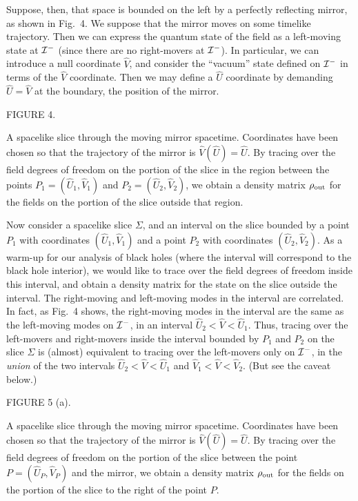 Suppose, then, that space is bounded on the left by a perfectly reflecting
mirror, as shown in Fig.~4.  We suppose that the mirror moves on some timelike
trajectory.  Then we can express the quantum state of the field as a
left-moving state at ${\cal I}^-$ (since there are no right-movers at ${\cal
I}^-$).  In particular, we can introduce a null coordinate $\hat V$, and
consider the ``vacuum'' state defined on ${\cal I}^-$ in terms of the $\hat V$
coordinate.  Then we may define a $\hat U$ coordinate by demanding $\hat U=\hat
V$ at the boundary, the position of the mirror.

\midinsert
\epsfysize=3in
\centerline{ }
\bigskip
\centerline{FIGURE 4.}
\medskip
{\centerline{\vbox{\hsize 5in \singlespace\tenrm \noindent
A spacelike slice through the moving mirror spacetime.
Coordinates have been chosen so that the trajectory of the mirror is $\hat
V(\hat U)=\hat U$. By tracing over the field degrees of freedom on the portion
of the slice in the region between the points $P_1=(\hat U_1, \hat V_1)$ and
$P_2=(\hat U_2,\hat V_2)$, we obtain a density matrix $\rho_{\rm out}$ for the
fields on the portion of the slice outside that region.
 }}}


\endinsert

Now consider a spacelike slice $\Sigma$, and an interval on the slice bounded
by a point $P_1$ with coordinates
$({\hat U}_1,{\hat V}_1)$ and a point $P_2$
with coordinates $({\hat U}_2,{\hat V}_2)$.  As a warm-up for our analysis of
black holes (where the interval will correspond to the black hole interior), we
would like to trace over the
field degrees of freedom inside this interval, and obtain a density matrix for
the state on the slice outside the interval.  The right-moving and left-moving
modes in the interval are correlated.  In fact, as Fig.~4 shows, the
right-moving modes in the interval are the same as the left-moving modes on
${\cal I}^-$, in an interval ${\hat U}_2<\hat V< {\hat U}_1$.  Thus, tracing
over the left-movers and right-movers inside the interval bounded by $P_1$ and
$P_2$
on the slice $\Sigma$ is (almost) equivalent to tracing over the left-movers
only on ${\cal I}^-$, in the {\it union} of the two intervals ${\hat U}_2<\hat
V< {\hat U}_1$ and ${\hat V}_1<\hat V< {\hat V}_2$.  (But see the caveat
below.)

\midinsert
\epsfysize=3in
\centerline{ }
\bigskip
\centerline{FIGURE 5 (a).}
\medskip
{\centerline{\vbox{\hsize 5in \singlespace\tenrm \noindent
A spacelike slice through the moving mirror
spacetime.  Coordinates have been chosen so that the trajectory of the mirror
is $\hat V(\hat U)=\hat U$.  By tracing over the field degrees of freedom on
the portion of the slice between the point $P=(\hat U_P,\hat V_P)$ and the
mirror, we obtain a density matrix $\rho_{\rm out}$ for the fields on the
portion of the slice to the right of the point $P$.
 }}}


